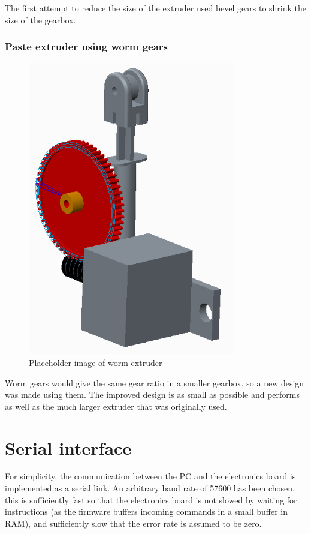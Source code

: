 The first attempt to reduce the size of the extruder used bevel gears to shrink the size of the gearbox. 

\subsubsection{Paste extruder using worm gears}
\begin{figure}[ht!]
\centering
\includegraphics[width=90mm]{resources/extruder_worm.png}
\caption{Placeholder image of worm extruder}
\label{overflow}
\end{figure}

Worm gears would give the same gear ratio in a smaller gearbox, so a new design was made using them. The improved design is as small as possible and performs as well as the much larger extruder that
was originally used.

\section{Serial interface}
For simplicity, the communication between the PC and the electronics board is implemented as a serial link. An arbitrary baud rate of 57600 has been
chosen, this is sufficiently fast so that the electronics board is not slowed by waiting for instructions (as the firmware buffers incoming commands in
a small buffer in RAM), and sufficiently slow that the error rate is assumed to be zero.

